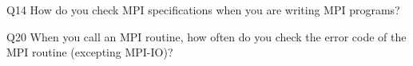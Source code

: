\begin{description}%
\item{Q14} How do you check MPI specifications when you are writing MPI programs?%
\item{Q20} When you call an MPI routine, how often do you check the error code of the MPI routine  (excepting MPI-IO)?%
\end{description}%
